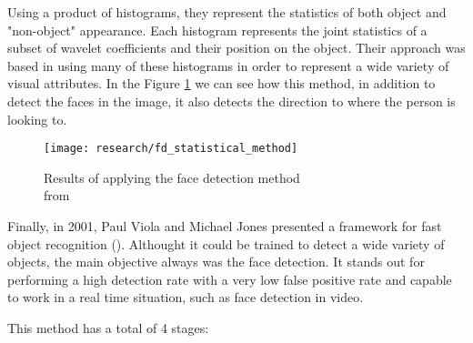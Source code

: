 	Using a product of histograms, they represent the statistics of both object and "non-object" appearance. Each histogram represents the joint statistics of a subset of wavelet coefficients and their position on the object. Their approach was based in using many of these histograms in order to represent a wide variety of visual attributes. In the Figure \ref{fig:statistical_method_face_det} we can see how this method, in addition to detect the faces in the image, it also detects the direction to where the person is looking to.

	\begin{figure}[!ht]
		\centering
		\texttt{[image: research/fd\_statistical\_method]}
		\caption{Results of applying the face detection method \\from \cite{schneiderman2000statistical}}
		\label{fig:statistical_method_face_det}
	\end{figure}

	Finally, in 2001, Paul Viola and Michael Jones presented a framework for fast object recognition (\cite{viola2001rapid}). Althought it could be trained to detect a wide variety of objects, the main objective always was the face detection. It stands out for performing a high detection rate with a very low false positive rate and capable to work in a real time situation, such as face detection in video.

	This method has a total of 4 stages:
	

